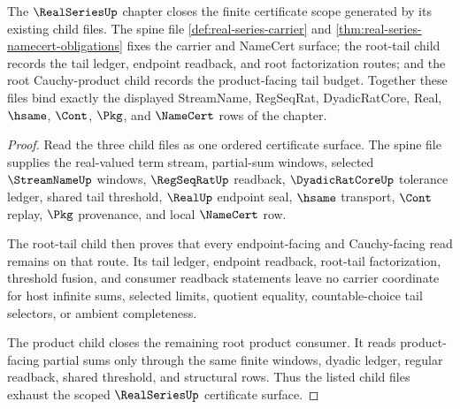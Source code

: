 \begin{theorem}
\label{thm:realseries-scoped-certificate-closure}
The $\RealSeriesUp$ chapter closes the finite certificate scope generated by its existing child files. The spine file \autoref{def:real-series-carrier} and \autoref{thm:real-series-namecert-obligations} fixes the carrier and NameCert surface; the root-tail child records the tail ledger, endpoint readback, and root factorization routes; and the root Cauchy-product child records the product-facing tail budget. Together these files bind exactly the displayed StreamName, RegSeqRat, DyadicRatCore, Real, $\hsame$, $\Cont$, $\Pkg$, and $\NameCert$ rows of the chapter.
\end{theorem}
\begin{proof}
Read the three child files as one ordered certificate surface. The spine file supplies the real-valued term stream, partial-sum windows, selected $\StreamNameUp$ windows, $\RegSeqRatUp$ readback, $\DyadicRatCoreUp$ tolerance ledger, shared tail threshold, $\RealUp$ endpoint seal, $\hsame$ transport, $\Cont$ replay, $\Pkg$ provenance, and local $\NameCert$ row.

The root-tail child then proves that every endpoint-facing and Cauchy-facing read remains on that route. Its tail ledger, endpoint readback, root-tail factorization, threshold fusion, and consumer readback statements leave no carrier coordinate for host infinite sums, selected limits, quotient equality, countable-choice tail selectors, or ambient completeness.

The product child closes the remaining root product consumer. It reads product-facing partial sums only through the same finite windows, dyadic ledger, regular readback, shared threshold, and structural rows. Thus the listed child files exhaust the scoped $\RealSeriesUp$ certificate surface.
\end{proof}

